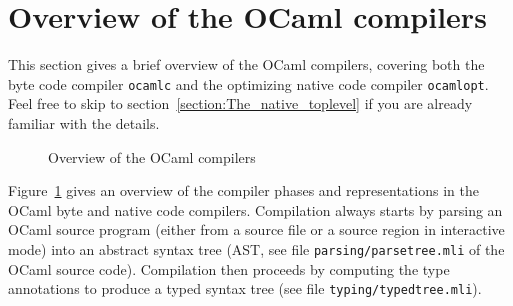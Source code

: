 \documentclass[10pt,a4paper,final,twocolumn]{article}
\begin{document}
\section{Overview of the OCaml compilers} \label{section:Overview_of_the_OCaml_compilers}

This section gives a brief overview of the OCaml compilers, covering both the byte code compiler
\texttt{ocamlc} and the optimizing native code compiler \texttt{ocamlopt}.
Feel free to skip to section~\ref{section:The_native_toplevel} if you are already familiar with the details.

\begin{figure}[htb]
  \centering
  \caption{Overview of the OCaml compilers}
  \label{fig:Overview_of_the_OCaml_compilers}
\end{figure}

Figure~\ref{fig:Overview_of_the_OCaml_compilers} gives an overview of the compiler phases
and representations in the OCaml byte and native code compilers. Compilation always starts
by parsing an OCaml source program (either from a source file or a source region in
interactive mode) into an abstract syntax tree (AST, see file \texttt{parsing/parsetree.mli}
of the OCaml source code). Compilation then proceeds by computing the type annotations to
produce a typed syntax tree (see file \texttt{typing/typedtree.mli}).
\end{document}
